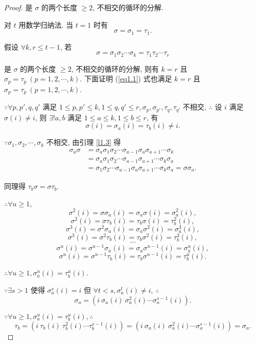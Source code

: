\documentclass[color=black,device=normal,lang=cn,mode=geye]{elegantnote}
\begin{document}
\begin{proof}
    是 $\sigma$ 的两个长度 $\geq2$, 不相交的循环的分解.

    对 $t$ 用数学归纳法. 当 $t=1$ 时有
    \[\sigma=\sigma_1=\tau_1.\]

    假设 $\forall k,r\leq t-1$, 若
    \[\sigma=\sigma_1\sigma_2\cdots\sigma_k=\tau_1\tau_2\cdots\tau_r\]

    是 $\sigma$ 的两个长度 $\geq2$, 不相交的循环的分解, 则有 $k=r$ 且 $\sigma_p=\tau_p\ (p=1,2,\cdots,k)$. 下面证明 (\ref{eq1.1}) 式也满足 $k=r$ 且 $\sigma_p=\tau_p\ (p=1,2,\cdots,k)$.

    $\because\forall p,p',q,q'$ 满足 $1\leq p,p'\leq k,1\leq q,q'\leq r,\sigma_p,\sigma_{p'},\tau_q,\tau_{q'}$ 不相交, $\therefore$ 设 $i$ 满足 $\sigma(i)\neq i$, 则 $\exists!a,b$ 满足 $1\leq a\leq k,1\leq b\leq r$, 有
    \[\sigma(i)=\sigma_a(i)=\tau_b(i)\neq i.\]

    $\because\sigma_1,\sigma_2,\cdots,\sigma_k$ 不相交, 由引理 \ref{l1.3} 得
    \begin{align*}
        \sigma_{a}\sigma & =\sigma_{a}\sigma_1\sigma_2\cdots\sigma_{a-1}\sigma_{a}\sigma_{a+1}\cdots\sigma_k \\
        & =\sigma_{a}\sigma_1\sigma_2\cdots\sigma_{a-1}\sigma_{a+1}\cdots\sigma_k\sigma_{a} \\
        & =\sigma_1\sigma_2\cdots\sigma_{a-1}\sigma_{a}\sigma_{a+1}\cdots\sigma_k\sigma_{a}=\sigma\sigma_{a}.
    \end{align*}

    同理得 $\tau_b\sigma=\sigma\tau_b$.

    $\therefore\forall u\geq1$,
    \[\sigma^2(i)=\sigma\sigma_a(i)=\sigma_a\sigma(i)=\sigma_a^2(i),\]
    \[\sigma^2(i)=\sigma\tau_b(i)=\tau_b\sigma(i)=\tau_b^2(i),\]
    \[\sigma^3(i)=\sigma^2\sigma_a(i)=\sigma_a\sigma^2(i)=\sigma_a^3(i),\]
    \[\sigma^3(i)=\sigma^2\tau_b(i)=\tau_b\sigma^2(i)=\tau_b^3(i),\]
    \[\cdots\]
    \[\sigma^u(i)=\sigma^{u-1}\sigma_a(i)=\sigma_a\sigma^{u-1}(i)=\sigma_a^u(i),\]
    \[\sigma^u(i)=\sigma^{u-1}\tau_b(i)=\tau_b\sigma^{u-1}(i)=\tau_b^u(i).\]

    $\therefore\forall u\geq1,\sigma_a^u(i)=\tau_b^u(i)$.

    $\because\exists s>1$ 使得 $\sigma_a^s(i)=i$ 但 $\forall t<s,\sigma_a^t(i)\neq i$, $\therefore$
    \[\sigma_a=(i\ \sigma_a(i)\ \sigma_a^2(i)\cdots\sigma_a^{s-1}(i)).\]

    $\because\forall u\geq1,\sigma_a^u(i)=\tau_b^u(i),\therefore$
    \[\tau_b=(i\ \tau_b(i)\ \tau_b^2(i)\cdots\tau_b^{s-1}(i))=(i\ \sigma_a(i)\ \sigma_a^2(i)\cdots\sigma_a^{s-1}(i))=\sigma_a.\]


\end{proof}
\end{document}
